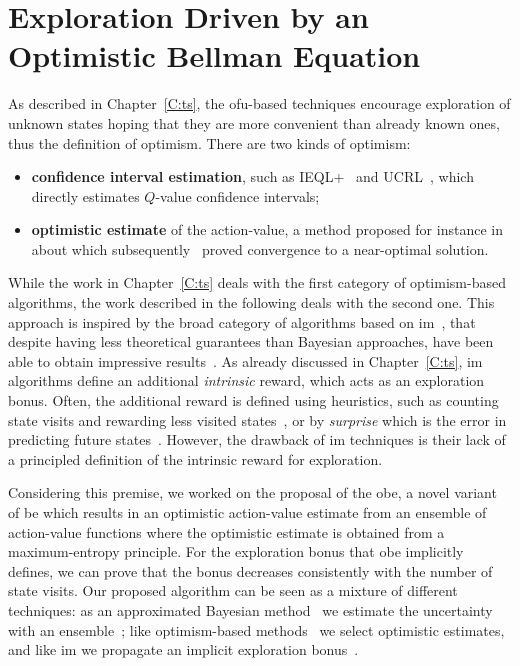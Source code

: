 \chapter{Exploration Driven by an Optimistic Bellman Equation}\label{C:opt}
As described in Chapter~\ref{C:ts}, the \gls{ofu}-based techniques encourage exploration of unknown states hoping that they are more convenient than already known ones, thus the definition of optimism. There are two kinds of optimism:
\begin{itemize}
\item \textbf{confidence interval estimation}, such as IEQL+~\cite{meuleau1999exploration} and UCRL~\cite{auer2007logarithmic}, which directly estimates $Q$-value confidence intervals;
 \item \textbf{optimistic estimate} of the action-value, a method proposed for instance in~\cite{sutton1998reinforcement} about which subsequently~\cite{even2002convergence} proved convergence to a near-optimal solution.
\end{itemize}
While the work in Chapter~\ref{C:ts} deals with the first category of optimism-based algorithms, the work described in the following deals with the second one. This approach is inspired by the broad category of algorithms based on \gls{im}~\cite{singh2004intrinsically}, that despite having less theoretical guarantees
than Bayesian approaches, have been able to obtain impressive results~\cite{bellemare2016unifying}. As already discussed in Chapter~\ref{C:ts}, \gls{im}
algorithms define an additional \textit{intrinsic} reward, which acts as an exploration bonus. Often, the additional reward is defined using heuristics, such as counting state visits and rewarding less visited states~\cite{ostrovski2017count}, or by \textit{surprise} which is the error in predicting future states~\cite{pathak2017curiosity}. However, the drawback of \gls{im} techniques is their lack of a principled definition of the intrinsic reward for exploration.

Considering this premise, we worked on the proposal of the \gls{obe}, a novel variant of \gls{be} which results in an optimistic action-value estimate
from an ensemble of action-value functions where the optimistic estimate is obtained from a maximum-entropy principle. For the exploration bonus that \gls{obe} implicitly defines, we can prove that the bonus decreases consistently with the number of
state visits. Our proposed algorithm can be seen as a mixture of
different techniques: as an approximated Bayesian method~\cite{engel2005reinforcement,vlassis2012bayesian} we estimate
the uncertainty with an ensemble~\cite{osband2017deep}; like optimism-based methods~\cite{lai1985asymptotically,kearns2002near,brafman2002r,azizzadenesheli2517efficient} we select
optimistic estimates, and like \gls{im} we propagate an implicit
exploration bonus~\cite{singh2004intrinsically,schmidhuber2008driven,white2010interval}.

